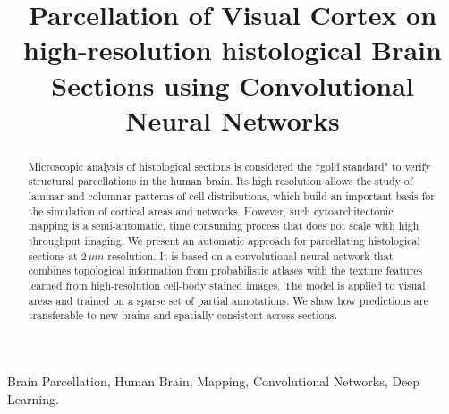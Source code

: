 \documentclass{article}
\title{Parcellation of Visual Cortex on high-resolution histological Brain Sections using Convolutional Neural Networks}
\begin{document}
%
\maketitle
%
\begin{abstract}
	Microscopic analysis of histological sections is considered the ``gold standard" to verify structural parcellations in the human brain. 
	Its high resolution allows the study of laminar and columnar patterns of cell distributions, which build an important basis for the simulation of cortical areas and networks. 
	However, such cytoarchitectonic mapping is a semi-automatic, time consuming process that does not scale with high throughput imaging. 
	We present an automatic approach for parcellating histological sections at $2\,\mu m$ resolution. 
	It is based on a convolutional neural network that combines topological information from probabilistic atlases with the texture features learned from high-resolution cell-body stained images.
	The model is applied to visual areas and trained on a sparse set of partial annotations. We show how predictions are transferable to new brains and spatially consistent across sections. 
	

\end{abstract}
%
\begin{keywords}
Brain Parcellation, Human Brain, Mapping, Convolutional Networks, Deep Learning.
\end{keywords}
%
\end{document}
